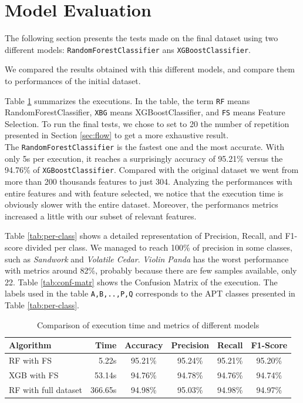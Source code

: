 \section{Model Evaluation}

The following section presents the tests made on the final dataset using two different models: \texttt{RandomForestClassifier} ans \texttt{XGBoostClassifier}.

We compared the results obtained with this different models, and compare them to performances of the initial dataset.

Table \ref{tab:final} summarizes the executions. In the table, the term \texttt{RF} means RandomForestClassifier, \texttt{XBG} means XGBoostClassifier, and \texttt{FS} means Feature Selection. To run the final tests, we chose to set  to 20 the number of repetition presented in Section \ref{sec:flow} to get a more exhaustive result.\\
The \texttt{RandomForestClassifier} is the fastest one and the most accurate. With only 5s per execution, it reaches a surprisingly accuracy of 95.21\% versus the 94.76\% of \texttt{XGBoostClassifier}. Compared with the original dataset we went from more than 200 thousands features to just 304. Analyzing the performances with entire features and with feature selected, we notice that the execution time is obviously slower with the entire dataset. Moreover, the performancs metrics increased a little with our subset of relevant features.

Table \ref{tab:per-class} shows a detailed representation of Precision, Recall, and F1-score divided per class. We managed to reach 100\% of precision in some classes, such as \textit{Sandwork} and \textit{Volatile Cedar}. \textit{Violin Panda} has the worst performance with metrics around 82\%, probably because there are few samples available, only 22. Table
\ref{tab:conf-matr} shows the Confusion Matrix of the execution. The labels used in the table \texttt{A,B,..,P,Q} corresponds to the APT classes presented in Table \ref{tab:per-class}. 
\begin{table}[!h]
	\centering
	\caption{Comparison of execution time and metrics of different models}
	\label{tab:final}
	\begin{tabular}{lrcccc}
		\toprule
		\textbf{Algorithm}                          & \textbf{Time}    & \textbf{Accuracy} & \textbf{Precision} & \textbf{Recall}  & \textbf{F1-Score} \\
		\midrule
		RF with FS & 5.22s   & 95.21\%  & 95.24\%   & 95.21\% & 95.20\%  \\
		XGB with FS      & 53.14s & 94.76\%  & 94.78\%   & 94.76\% & 94.74\%  \\
		RF with full dataset   &  366.65s  & 94.98\% &       95.03\%    &   94.98\%      & 94.97\%\\
		\bottomrule         
	\end{tabular}
\end{table}


